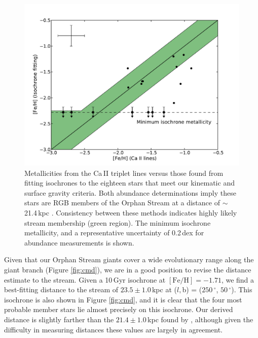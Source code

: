 \documentclass{emulateapj}
\begin{document}
\begin{figure}[h]
	\includegraphics[width=\columnwidth]{./figures/feh.pdf}
	\caption{Metallicities from the Ca\,\textsc{II} triplet lines versus those found from fitting isochrones to the eighteen stars that meet our kinematic and surface gravity criteria. Both abundance determinations imply these stars are RGB members of the Orphan Stream at a distance of $\sim$21.4\,kpc \citep{Newberg;et-al_2010}. Consistency between these methods indicates highly likely stream membership (green region). The minimum isochrone metallicity, and a representative uncertainty of 0.2\,dex for abundance measurements is shown.}
	\label{fig:feh}
\end{figure}



Given that our Orphan Stream giants cover a wide evolutionary range along the giant branch (Figure \ref{fig:cmd}), we are in a good position to revise the distance estimate to the stream. Given a 10\,Gyr \citet{Girardi;et-al_2008} isochrone at $[\mbox{Fe/H}] = -1.71$, we find a best-fitting distance to the stream of $23.5 \pm 1.0$\,kpc at ($l, $b) = ($250\,^\circ$, $50\,^\circ$). This isochrone is also shown in Figure \ref{fig:cmd}, and it is clear that the four most probable member stars lie almost precisely on this isochrone. Our derived distance is slightly farther than the $21.4 \pm 1.0$\,kpc found by \citet{Newberg;et-al_2010}, although given the difficulty in measuring distances these values are largely in agreement.
\end{document}
